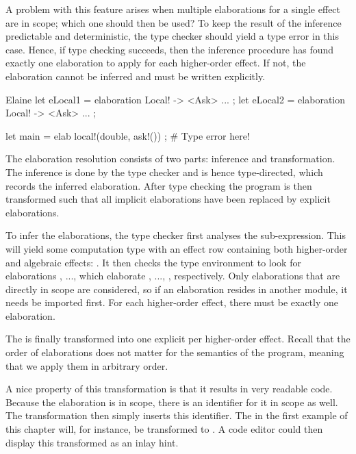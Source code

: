 A problem with this feature arises when multiple elaborations for a single effect are in scope; which one should then be used? To keep the result of the inference predictable and deterministic, the type checker should yield a type error in this case. Hence, if type checking succeeds, then the inference procedure has found exactly one elaboration to apply for each higher-order effect. If not, the elaboration cannot be inferred and must be written explicitly.

\begin{lst}{Elaine}
let eLocal1 = elaboration Local! -> <Ask> { ... };
let eLocal2 = elaboration Local! -> <Ask> { ... };

let main = elab { local!(double, ask!()) }; # Type error here!
\end{lst}
%
The elaboration resolution consists of two parts: inference and transformation. The inference is done by the type checker and is hence type-directed, which records the inferred elaboration. After type checking the program is then transformed such that all implicit elaborations have been replaced by explicit elaborations.

To infer the elaborations, the type checker first analyses the sub-expression. This will yield some computation type with an effect row containing both higher-order and algebraic effects: . It then checks the type environment to look for elaborations , ...,  which elaborate , ..., , respectively. Only elaborations that are directly in scope are considered, so if an elaboration resides in another module, it needs be imported first. For each higher-order effect, there must be exactly one elaboration.

The  is finally transformed into one explicit  per higher-order effect. Recall that the order of elaborations does not matter for the semantics of the program, meaning that we apply them in arbitrary order.

A nice property of this transformation is that it results in very readable code. Because the elaboration is in scope, there is an identifier for it in scope as well. The transformation then simply inserts this identifier. The \elab in the first example of this chapter will, for instance, be transformed to . A code editor could then display this transformed  as an inlay hint.

